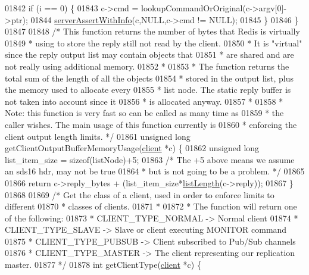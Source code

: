\begin{DoxyCode}
{{{{{{{{{{{{{{{{{{{{01842     \textcolor{keywordflow}{if} (i == 0) \{
01843         c->cmd = lookupCommandOrOriginal(c->argv[0]->ptr);
01844         \hyperlink{server_8h_a7308f76cbff9a8d3797fe78190b91282}{serverAssertWithInfo}(c,NULL,c->cmd != NULL);
01845     \}
01846 \}
01847 
01848 \textcolor{comment}{/* This function returns the number of bytes that Redis is virtually}
01849 \textcolor{comment}{ * using to store the reply still not read by the client.}
01850 \textcolor{comment}{ * It is "virtual" since the reply output list may contain objects that}
01851 \textcolor{comment}{ * are shared and are not really using additional memory.}
01852 \textcolor{comment}{ *}
01853 \textcolor{comment}{ * The function returns the total sum of the length of all the objects}
01854 \textcolor{comment}{ * stored in the output list, plus the memory used to allocate every}
01855 \textcolor{comment}{ * list node. The static reply buffer is not taken into account since it}
01856 \textcolor{comment}{ * is allocated anyway.}
01857 \textcolor{comment}{ *}
01858 \textcolor{comment}{ * Note: this function is very fast so can be called as many time as}
01859 \textcolor{comment}{ * the caller wishes. The main usage of this function currently is}
01860 \textcolor{comment}{ * enforcing the client output length limits. */}
01861 \textcolor{keywordtype}{unsigned} \textcolor{keywordtype}{long} getClientOutputBufferMemoryUsage(\hyperlink{structclient}{client} *c) \{
01862     \textcolor{keywordtype}{unsigned} \textcolor{keywordtype}{long} list\_item\_size = \textcolor{keyword}{sizeof}(listNode)+5;
01863     \textcolor{comment}{/* The +5 above means we assume an sds16 hdr, may not be true}
01864 \textcolor{comment}{     * but is not going to be a problem. */}
01865 
01866     \textcolor{keywordflow}{return} c->reply\_bytes + (list\_item\_size*\hyperlink{adlist_8h_afde0ab079f934670e82119b43120e94b}{listLength}(c->reply));
01867 \}
01868 
01869 \textcolor{comment}{/* Get the class of a client, used in order to enforce limits to different}
01870 \textcolor{comment}{ * classes of clients.}
01871 \textcolor{comment}{ *}
01872 \textcolor{comment}{ * The function will return one of the following:}
01873 \textcolor{comment}{ * CLIENT\_TYPE\_NORMAL -> Normal client}
01874 \textcolor{comment}{ * CLIENT\_TYPE\_SLAVE  -> Slave or client executing MONITOR command}
01875 \textcolor{comment}{ * CLIENT\_TYPE\_PUBSUB -> Client subscribed to Pub/Sub channels}
01876 \textcolor{comment}{ * CLIENT\_TYPE\_MASTER -> The client representing our replication master.}
01877 \textcolor{comment}{ */}
01878 \textcolor{keywordtype}{int} getClientType(\hyperlink{structclient}{client} *c) \{
}}}}}}}}}}}}}}}}}}}}
\end{DoxyCode}
